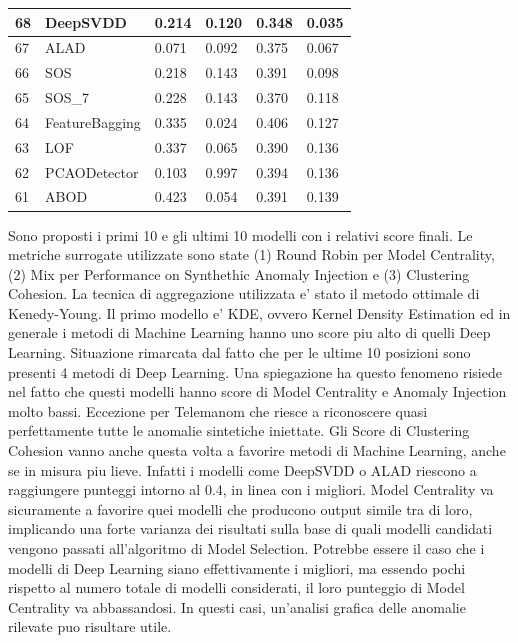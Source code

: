 \begin{table}[H]
\begin{minipage}{.5\textwidth}
{\begin{tabular}{|l|l|l|l|l|l|}
				\hline
				68          & DeepSVDD       & 0.214       & 0.120        & 0.348       & 0.035            \\ 
				\hline
				67          & ALAD           & 0.071       & 0.092        & 0.375       & 0.067            \\ 
				\hline
				66          & SOS            & 0.218       & 0.143        & 0.391       & 0.098            \\ 
				\hline
				65          & SOS\_7         & 0.228       & 0.143        & 0.370       & 0.118            \\ 
				\hline
				64          & FeatureBagging & 0.335       & 0.024        & 0.406       & 0.127            \\ 
				\hline
				63          & LOF            & 0.337       & 0.065        & 0.390       & 0.136            \\ 
				\hline
				62          & PCAODetector   & 0.103       & 0.997        & 0.394       & 0.136            \\ 
				\hline
				61          & ABOD           & 0.423       & 0.054        & 0.391       & 0.139            \\
				\hline
			\end{tabular}}
	\end{minipage}
\end{table}




Sono proposti i primi 10 e gli ultimi 10 modelli con i relativi score finali. Le metriche surrogate utilizzate sono state (1) Round Robin per Model Centrality, (2) Mix per Performance on Synthethic Anomaly Injection e (3) Clustering Cohesion. La tecnica di aggregazione utilizzata e' stato il metodo ottimale di Kenedy-Young.
Il primo modello e' KDE, ovvero Kernel Density Estimation ed in generale i metodi di Machine Learning hanno uno score piu alto di quelli Deep Learning. Situazione rimarcata dal fatto che per le ultime 10 posizioni sono presenti 4 metodi di Deep Learning. Una spiegazione ha questo fenomeno risiede nel fatto che questi modelli hanno score di Model Centrality e Anomaly Injection molto bassi. Eccezione per Telemanom che riesce a riconoscere quasi perfettamente tutte le anomalie sintetiche iniettate. Gli Score di Clustering Cohesion vanno anche questa volta a favorire metodi di Machine Learning, anche se in misura piu lieve. Infatti i modelli come DeepSVDD o ALAD riescono a  raggiungere punteggi intorno al 0.4, in linea con i migliori.
Model Centrality va sicuramente a favorire quei modelli che producono output simile tra di loro, implicando una forte varianza dei risultati sulla base di quali modelli candidati vengono passati all'algoritmo di Model Selection. Potrebbe essere il caso che i modelli di Deep Learning siano effettivamente i migliori, ma essendo pochi rispetto al numero totale di modelli considerati, il loro punteggio di Model Centrality va abbassandosi. In questi casi, un'analisi grafica delle anomalie rilevate puo risultare utile.

